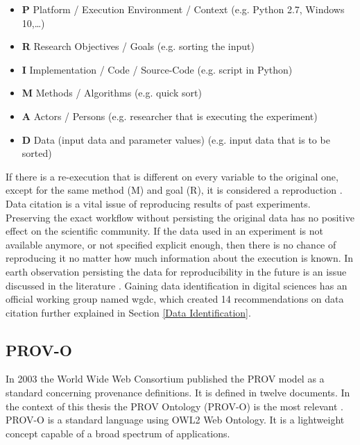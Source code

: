 \documentclass[draft,final]{vutinfth} %
\begin{document}
\begin{itemize}
	\item \textbf{P} Platform / Execution Environment / Context (e.g. Python 2.7, Windows 10,\dots) \\
	\item \textbf{R} Research Objectives / Goals (e.g. sorting the input) \\
	\item \textbf{I} Implementation / Code / Source-Code (e.g. script in Python) \\
	\item \textbf{M} Methods / Algorithms (e.g. quick sort) \\
	\item \textbf{A} Actors / Persons (e.g. researcher that is executing the experiment) \\
	\item \textbf{D} Data (input data and parameter values)   (e.g. input data that is to be sorted) 
\end{itemize}

If there is a re-execution that is different on every variable to the original one, except for the same method (M) and goal (R), it is considered a reproduction \cite{primad}. 
\\  
Data citation is a vital issue of reproducing results of past experiments. Preserving the exact workflow without persisting the original data has no positive effect on the scientific community. If the data used in an experiment is not available anymore, or not specified explicit enough, then there is no chance of reproducing it no matter how much information about the execution is known. In earth observation persisting the data for reproducibility in the future is an issue discussed in the literature \cite{6352411}. Gaining data identification in digital sciences has an official working group named \gls{wgdc}, which created 14 recommendations on data citation further explained in Section \ref{Data Identification}.

 \subsection{PROV-O}\label{PROV}
In 2003 the World Wide Web Consortium published the PROV model as a standard concerning provenance definitions. It is defined in twelve documents. In the context of this thesis the PROV Ontology (PROV-O) is the most relevant \cite{733f89c65e4844f9aabcae1c276a5602}. 
PROV-O is a standard language using OWL2 Web Ontology. It is a lightweight concept capable of a broad spectrum of applications.  
\end{document}
